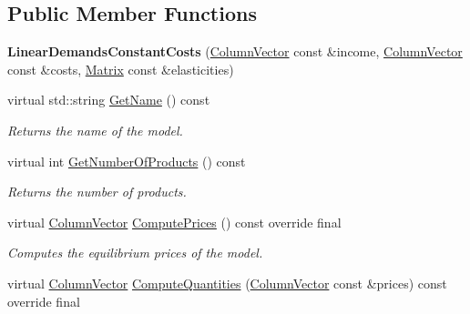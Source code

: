 \subsection*{Public Member Functions}
\begin{DoxyCompactItemize}
\item 
\mbox{\label{classLinearDemandsConstantCosts_a0a7e9c271148594fdc0e4024cfd521a9}} 
{\bfseries Linear\+Demands\+Constant\+Costs} (\hyperlink{classColumnVector}{Column\+Vector} const \&income, \hyperlink{classColumnVector}{Column\+Vector} const \&costs, \hyperlink{classMatrix}{Matrix} const \&elasticities)
\item 
\mbox{\label{classLinearDemandsConstantCosts_a5b137f8fe14c712fba111a5ddb62ca49}} 
virtual std\+::string \hyperlink{classLinearDemandsConstantCosts_a5b137f8fe14c712fba111a5ddb62ca49}{Get\+Name} () const
\begin{DoxyCompactList}\small\item\em Returns the name of the model. \end{DoxyCompactList}\item 
\mbox{\label{classLinearDemandsConstantCosts_a05de34331dce8d63ebf778d3436780ba}} 
virtual int \hyperlink{classLinearDemandsConstantCosts_a05de34331dce8d63ebf778d3436780ba}{Get\+Number\+Of\+Products} () const
\begin{DoxyCompactList}\small\item\em Returns the number of products. \end{DoxyCompactList}\item 
\mbox{\label{classLinearDemandsConstantCosts_ae2f4565860b89a5576b54884a4d520d1}} 
virtual \hyperlink{classColumnVector}{Column\+Vector} \hyperlink{classLinearDemandsConstantCosts_ae2f4565860b89a5576b54884a4d520d1}{Compute\+Prices} () const override final
\begin{DoxyCompactList}\small\item\em Computes the equilibrium prices of the model. \end{DoxyCompactList}\item 
virtual \hyperlink{classColumnVector}{Column\+Vector} \hyperlink{classLinearDemandsConstantCosts_a310864e458935098502561540a71a88c}{Compute\+Quantities} (\hyperlink{classColumnVector}{Column\+Vector} const \&prices) const override final

\end{DoxyCompactItemize}
